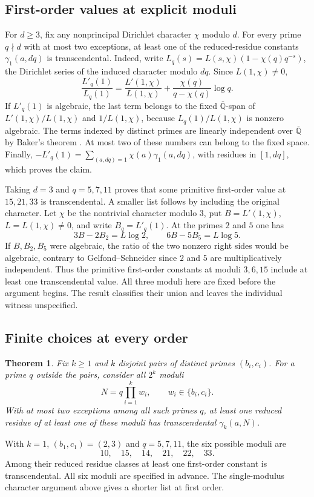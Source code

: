 \documentclass[11pt,a4paper,oneside,openany]{report}
\newtheorem{theorem}{Theorem}[section]
\theoremstyle{remark}\newtheorem{remark}[theorem]{Remark}
\numberwithin{equation}{section}
\begin{document}
\subsection*{First-order values at explicit moduli}
For $d\ge3$, fix any nonprincipal Dirichlet character $\chi$ modulo $d$.
For every prime $q\nmid d$ with at most two exceptions, at least one
of the reduced-residue constants $\gamma_1(a,dq)$ is transcendental.
Indeed, write $L_q(s)=L(s,\chi)(1-\chi(q)q^{-s})$, the Dirichlet
series of the induced character modulo $dq$. Since $L(1,\chi)\ne0$,
\[
 \frac{L'_q(1)}{L_q(1)}
 =\frac{L'(1,\chi)}{L(1,\chi)}
       +\frac{\chi(q)}{q-\chi(q)}\log q.
\]
If $L'_q(1)$ is algebraic, the last term belongs to the fixed
$\overline{\mathbb Q}$-span of $L'(1,\chi)/L(1,\chi)$ and
$1/L(1,\chi)$, because $L_q(1)/L(1,\chi)$ is nonzero algebraic.
The terms indexed by distinct primes are linearly independent over $\overline{\mathbb Q}$ by Baker's theorem \cite{baker}. At most two of these numbers can belong to the fixed space. Finally,
$-L'_q(1)=\sum_{(a,dq)=1}\chi(a)\gamma_1(a,dq)$, with residues in
$[1,dq]$, which proves the claim.


Taking $d=3$ and $q=5,7,11$ proves that some primitive first-order value at $15,21,33$ is transcendental. A smaller list follows by including the original character. Let $\chi$ be the nontrivial character modulo $3$, put $B=L'(1,\chi)$, $L=L(1,\chi)\ne0$, and write $B_q=L'_q(1)$. At the primes $2$ and $5$ one has
\[
          3B-2B_2=L\log2,\qquad 6B-5B_5=L\log5.
\]
If $B,B_2,B_5$ were algebraic, the ratio of the two nonzero right sides would be algebraic, contrary to Gelfond--Schneider since $2$ and $5$ are multiplicatively independent. Thus the primitive first-order constants at moduli $3,6,15$ include at least one transcendental value. All three moduli here are fixed before the argument begins. The result classifies their union and leaves the individual witness unspecified.

\subsection*{Finite choices at every order}
\begin{theorem}\label{ch6:t:semi}
Fix $k\ge1$ and $k$ disjoint pairs of distinct primes $(b_i,c_i)$. For a prime $q$ outside the pairs, consider all $2^k$ moduli
\[
  N=q\prod_{i=1}^k w_i,\qquad w_i\in\{b_i,c_i\}.
\]
With at most two exceptions among all such primes $q$, at least one reduced residue of at least one of these moduli has transcendental $\gamma_k(a,N)$.
\end{theorem}
With $k=1$, $(b_1,c_1)=(2,3)$ and $q=5,7,11$, the six possible moduli are
\[
                  10,\quad 15,\quad 14,\quad 21,\quad 22,\quad 33.
\]
Among their reduced residue classes at least one first-order constant is transcendental. All six moduli are specified in advance. The single-modulus character argument above gives a shorter list at first order.
\end{document}
